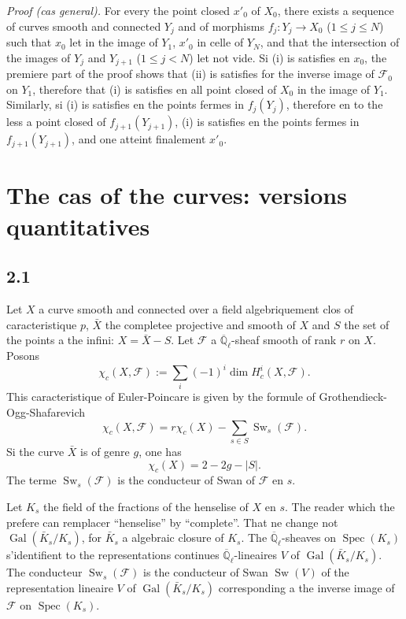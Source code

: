 \documentclass[11pt,a4paper]{article}
\theoremstyle{plain}
\theoremstyle{definition}
\DeclareMathOperator{\Spec}{Spec}
\DeclareMathOperator{\Gal}{Gal}
\DeclareMathOperator{\Sw}{Sw}
\begin{document}
\medskip
\noindent\textit{Proof (cas general).} For every the point closed $x'_0$ of $X_0$, there exists a sequence of curves smooth and connected $Y_j$ and of morphisms $f_j: Y_j \to X_0$ ($1 \leq j \leq N$) such that $x_0$ let in the image of $Y_1$, $x'_0$ in celle of $Y_N$, and that the intersection of the images of $Y_j$ and $Y_{j+1}$ ($1 \leq j < N$) let not vide. Si (i) is satisfies en $x_0$, the premiere part of the proof shows that (ii) is satisfies for the inverse image of $\mathcal{F}_0$ on $Y_1$, therefore that (i) is satisfies en all point closed of $X_0$ in the image of $Y_1$. Similarly, si (i) is satisfies en the points fermes in $f_j(Y_j)$, therefore en to the less a point closed of $f_{j+1}(Y_{j+1})$, (i) is satisfies en the points fermes in $f_{j+1}(Y_{j+1})$, and one atteint finalement $x'_0$.


\section{The cas of the curves: versions quantitatives}

\subsection{2.1}

Let $X$ a curve smooth and connected over a field algebriquement clos of caracteristique $p$, $\bar{X}$ the completee projective and smooth of $X$ and $S$ the set of the points a the infini: $X = \bar{X} - S$. Let $\mathcal{F}$ a $\overline{\mathbb{Q}}_\ell$-sheaf smooth of rank $r$ on $X$. Posons
\[
\chi_c(X, \mathcal{F}) := \sum_i (-1)^i \dim H_c^i(X, \mathcal{F}).
\]
This caracteristique of Euler-Poincare is given by the formule of Grothendieck-Ogg-Shafarevich
\begin{equation}\label{eq:2.1.1}
\chi_c(X, \mathcal{F}) = r\chi_c(X) - \sum_{s \in S} \Sw_s(\mathcal{F}).
\end{equation}
Si the curve $\bar{X}$ is of genre $g$, one has
\begin{equation}\label{eq:2.1.2}
\chi_c(X) = 2 - 2g - |S|.
\end{equation}
The terme $\Sw_s(\mathcal{F})$ is the conducteur of Swan of $\mathcal{F}$ en $s$.

Let $K_s$ the field of the fractions of the henselise of $X$ en $s$. The reader which the prefere can remplacer ``henselise'' by ``complete''. That ne change not $\Gal(\bar{K}_s/K_s)$, for $\bar{K}_s$ a algebraic closure of $K_s$. The $\overline{\mathbb{Q}}_\ell$-sheaves on $\Spec(K_s)$ s'identifient to the representations continues $\overline{\mathbb{Q}}_\ell$-lineaires $V$ of $\Gal(\bar{K}_s/K_s)$. The conducteur $\Sw_s(\mathcal{F})$ is the conducteur of Swan $\Sw(V)$ of the representation lineaire $V$ of $\Gal(\bar{K}_s/K_s)$ corresponding a the inverse image of $\mathcal{F}$ on $\Spec(K_s)$.
\end{document}
